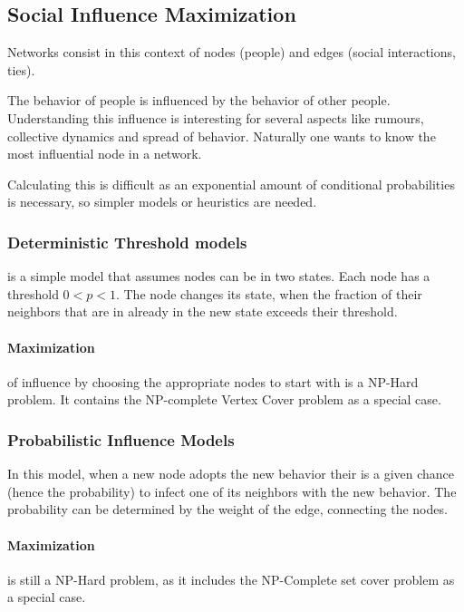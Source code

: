 \subsection{Social Influence Maximization} %
\label{sub:social_influence_maximization}
Networks consist in this context of nodes (people)
and edges (social interactions, ties).

The behavior of people is influenced by the behavior of other people.
Understanding this influence is interesting for several aspects
like rumours, collective dynamics and spread of behavior.
Naturally one wants to know the most influential node in a network.

Calculating this is difficult as an exponential amount of conditional probabilities is necessary,
so simpler models or heuristics are needed.

\subsubsection{Deterministic Threshold models} %
\label{ssub:deterministic_threshold_models}
is a simple model that assumes nodes can be in two states.
Each node has a threshold $0 < p < 1$.
The node changes its state,
when the fraction of their neighbors that are in already in the new state exceeds their threshold.

\paragraph{Maximization} %
\label{par:maximization}
of influence by choosing the appropriate nodes to start with
is a NP-Hard problem.
It contains the NP-complete Vertex Cover problem as a special case.

\subsubsection{Probabilistic Influence Models} %
\label{ssub:probabilistic_influence_models}
In this model,
when a new node adopts the new behavior their is a given chance (hence the probability)
to infect one of its neighbors with the new behavior.
The probability can be determined by the weight of the edge,
connecting the nodes.
\paragraph{Maximization} %
\label{par:maximization}
is still a NP-Hard problem,
as it includes the NP-Complete set cover problem as a special case.

